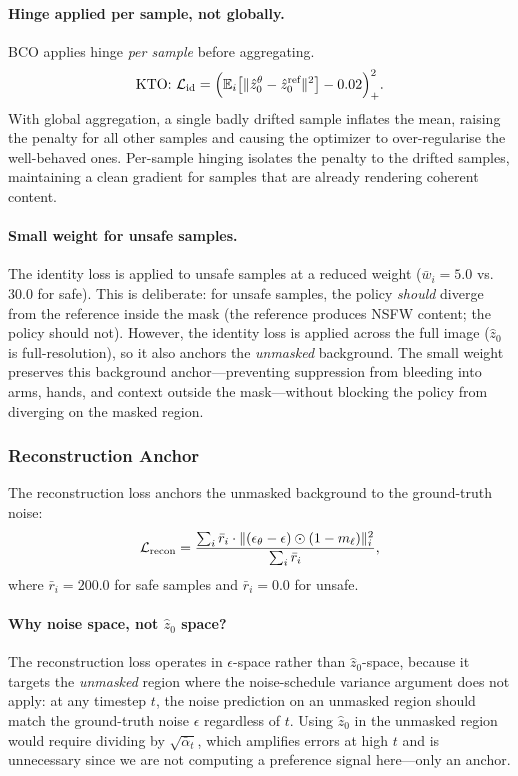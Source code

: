 \paragraph{Hinge applied per sample, not globally.}
BCO applies hinge \emph{per sample} before aggregating.
\begin{equation}
  \text{KTO: } \mathcal{L}_\text{id}
  = \Big(\mathbb{E}_i\!\left[\|\hat{z}_0^\theta - \hat{z}_0^\text{ref}\|^2\right]
    - 0.02\Big)_+^2.
    \notag
\end{equation}
With global aggregation, a single badly drifted sample inflates the mean,
raising the penalty for all other samples and causing the optimizer to
over-regularise the well-behaved ones.
Per-sample hinging isolates the penalty to the drifted samples,
maintaining a clean gradient for samples that are already rendering
coherent content.

\paragraph{Small weight for unsafe samples.}
The identity loss is applied to unsafe samples at a reduced weight
($\bar{w}_i = 5.0$ vs.\ $30.0$ for safe).
This is deliberate: for unsafe samples, the policy \emph{should} diverge
from the reference inside the mask (the reference produces NSFW content;
the policy should not).
However, the identity loss is applied across the full image ($\hat{z}_0$
is full-resolution), so it also anchors the \emph{unmasked} background.
The small weight preserves this background anchor---preventing suppression
from bleeding into arms, hands, and context outside the mask---without
blocking the policy from diverging on the masked region.

\subsubsection{Reconstruction Anchor}

The reconstruction loss anchors the unmasked background to the
ground-truth noise:
\begin{equation}
  \mathcal{L}_\text{recon}
  = \frac{\sum_i \bar{r}_i \cdot \|(\epsilon_\theta - \epsilon) \odot (1-m_\ell)\|^2_i}
    {\sum_i \bar{r}_i},
    \notag
  \label{eq:recon_loss}
\end{equation}
where $\bar{r}_i = 200.0$ for safe samples and $\bar{r}_i = 0.0$ for
unsafe.

\paragraph{Why noise space, not $\hat{z}_0$ space?}
The reconstruction loss operates in $\epsilon$-space rather than
$\hat{z}_0$-space, because it targets the \emph{unmasked} region where the
noise-schedule variance argument does not apply: at any timestep $t$, the
noise prediction on an unmasked region should match the ground-truth
noise $\epsilon$ regardless of $t$.
Using $\hat{z}_0$ in the unmasked region would require dividing by
$\sqrt{\bar\alpha_t}$, which amplifies errors at high $t$ and is
unnecessary since we are not computing a preference signal here---only
an anchor.


